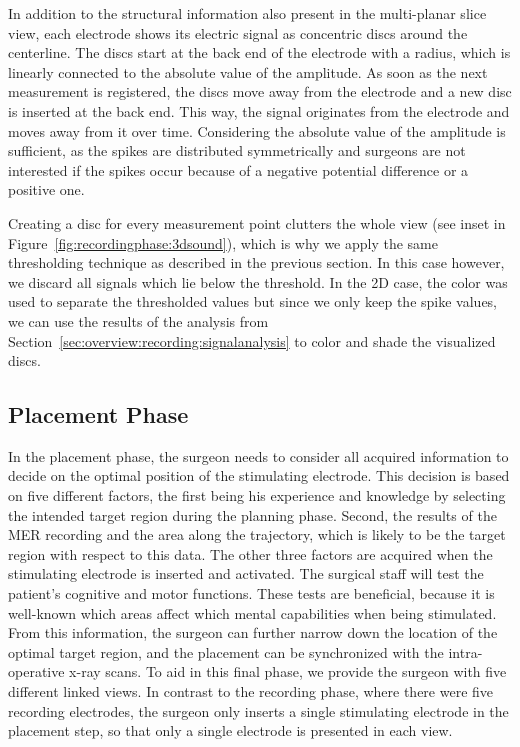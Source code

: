 \documentclass[journal]{vgtc}                %
\begin{document}
In addition to the structural information also present in the multi-planar slice view, each electrode shows its electric signal as concentric discs around the centerline. The discs start at the back end of the electrode with a radius, which is linearly connected to the absolute value of the amplitude. As soon as the next measurement is registered, the discs move away from the electrode and a new disc is inserted at the back end. This way, the signal originates from the electrode and moves away from it over time. Considering the absolute value of the amplitude is sufficient, as the spikes are distributed symmetrically and surgeons are not interested if the spikes occur because of a negative potential difference or a positive one.

Creating a disc for every measurement point clutters the whole view (see inset in Figure~\ref{fig:recordingphase:3dsound}), which is why we apply the same thresholding technique as described in the previous section. In this case however, we discard all signals which lie below the threshold. In the 2D case, the color was used to separate the thresholded values but since we only keep the spike values, we can use the results of the analysis from Section~\ref{sec:overview:recording:signalanalysis} to color and shade the visualized discs.


\subsection{Placement Phase}\label{sec:overview:placement}
In the placement phase, the surgeon needs to consider all acquired information to decide on the optimal position of the stimulating electrode. This decision is based on five different factors, the first being his experience and knowledge by selecting the intended target region during the planning phase. Second, the results of the MER recording and the area along the trajectory, which is likely to be the target region with respect to this data. The other three factors are acquired when the stimulating electrode is inserted and activated. The surgical staff will test the patient's cognitive and motor functions. These tests are beneficial, because it is well-known which areas affect which mental capabilities when being stimulated. From this information, the surgeon can further narrow down the location of the optimal target region, and the placement can be synchronized with the intra-operative x-ray scans. To aid in this final phase, we provide the surgeon with five different linked views. In contrast to the recording phase, where there were five recording electrodes, the surgeon only inserts a single stimulating electrode in the placement step, so that only a single electrode is presented in each view.
\end{document}
